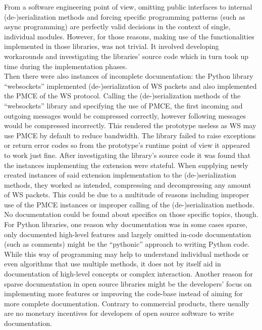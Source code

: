 From a software engineering point of view, omitting public interfaces to internal (de-)serialization methods and forcing specific programming patterns (such as async programming) are perfectly valid decisions in the context of single, individual modules. However, for those reasons, making use of the functionalities implemented in those libraries, was not trivial. It involved developing workarounds and investigating the libraries' source code which in turn took up time during the implementation phases.\\
Then there were also instances of incomplete documentation: the Python library \enquote{websockets} implemented (de-)serialization of \ac{WS} packets and also implemented the \ac{PMCE} of the \ac{WS} protocol. Calling the (de-)serialization methods of the \enquote{websockets} library and specifying the use of \ac{PMCE}, the first incoming and outgoing messages would be compressed correctly, however following messages would be compressed incorrectly. This rendered the prototype useless as \ac{WS} may use \ac{PMCE} by default to reduce bandwidth. The library failed to raise exceptions or return error codes so from the prototype's runtime point of view it appeared to work just fine. After investigating the library's source code it was found that the instances implementing the extension were stateful. When supplying newly created instances of said extension implementation to the (de-)serialization methods, they worked as intended, compressing and decompressing any amount of \ac{WS} packets. This could be due to a multitude of reasons including improper use of the \ac{PMCE} instances or improper calling of the (de-)serialization methods. No documentation could be found about specifics on those specific topics, though.\\
For Python libraries, one reason why documentation was in some cases sparse, only documented high-level features and largely omitted in-code documentation (such as comments) might be the \enquote{pythonic} approach to writing Python code. While this way of programming may help to understand individual methods or even algorithms that use multiple methods, it does not by itself aid in documentation of high-level concepts or complex interaction. Another reason for sparse documentation in open source libraries might be the developers' focus on implementing more features or improving the code-base instead of aiming for more complete documentation. Contrary to commercial products, there usually are no monetary incentives for developers of open source software to write documentation.


